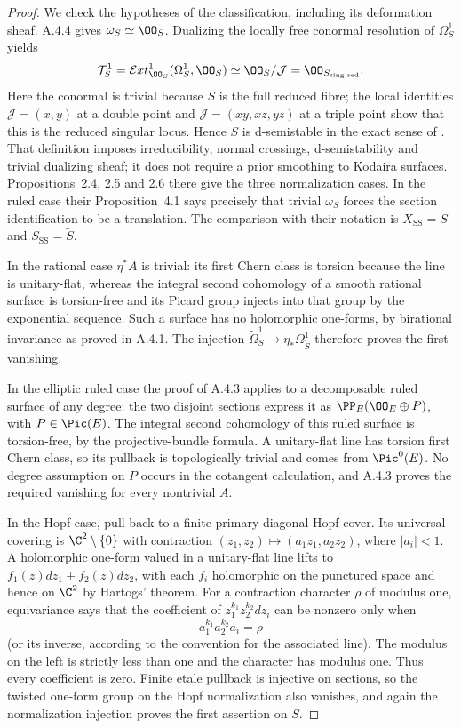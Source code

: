 \begin{proof}
We check the hypotheses of the classification, including its deformation sheaf. A.4.4 gives $\omega_S\simeq\OO_S$. Dualizing the locally free conormal resolution of $\Omega_S^1$ yields
\[
 \mathcal T^1_S=\mathcal Ext^1_{\OO_S}(\Omega_S^1,\OO_S)
 \simeq\OO_S/\mathcal J=\OO_{S_{\rm sing,red}}.
\]
Here the conormal is trivial because $S$ is the full reduced fibre; the local identities $\mathcal J=(x,y)$ at a double point and $\mathcal J=(xy,xz,yz)$ at a triple point show that this is the reduced singular locus. Hence $S$ is d-semistable in the exact sense of \cite[Definition~2.1]{SS2002}. That definition imposes irreducibility, normal crossings, d-semistability and trivial dualizing sheaf; it does not require a prior smoothing to Kodaira surfaces. Propositions~2.4, 2.5 and 2.6 there give the three normalization cases. In the ruled case their Proposition~4.1 says precisely that trivial $\omega_S$ forces the section identification to be a translation. The comparison with their notation is $X_{\mathrm{SS}}=S$ and $S_{\mathrm{SS}}=\widetilde S$.

In the rational case $\eta^*A$ is trivial: its first Chern class is torsion because the line is unitary-flat, whereas the integral second cohomology of a smooth rational surface is torsion-free and its Picard group injects into that group by the exponential sequence. Such a surface has no holomorphic one-forms, by birational invariance as proved in A.4.1. The injection $\widetilde\Omega_S^1\to\eta_*\Omega^1_{\widetilde S}$ therefore proves the first vanishing.

In the elliptic ruled case the proof of A.4.3 applies to a decomposable ruled surface of any degree: the two disjoint sections express it as $\PP_E(\OO_E\oplus P)$, with $P\in\Pic(E)$. The integral second cohomology of this ruled surface is torsion-free, by the projective-bundle formula. A unitary-flat line has torsion first Chern class, so its pullback is topologically trivial and comes from $\Pic^0(E)$. No degree assumption on $P$ occurs in the cotangent calculation, and A.4.3 proves the required vanishing for every nontrivial $A$.

In the Hopf case, pull back to a finite primary diagonal Hopf cover. Its universal covering is $\C^2\setminus\{0\}$ with contraction $(z_1,z_2)\mapsto(a_1z_1,a_2z_2)$, where $|a_i|<1$. A holomorphic one-form valued in a unitary-flat line lifts to $f_1(z)dz_1+f_2(z)dz_2$, with each $f_i$ holomorphic on the punctured space and hence on $\C^2$ by Hartogs' theorem. For a contraction character $\rho$ of modulus one, equivariance says that the coefficient of $z_1^{k_1}z_2^{k_2}dz_i$ can be nonzero only when
\[
 a_1^{k_1}a_2^{k_2}a_i=\rho
\]
(or its inverse, according to the convention for the associated line). The modulus on the left is strictly less than one and the character has modulus one. Thus every coefficient is zero. Finite etale pullback is injective on sections, so the twisted one-form group on the Hopf normalization also vanishes, and again the normalization injection proves the first assertion on $S$.


\end{proof}
